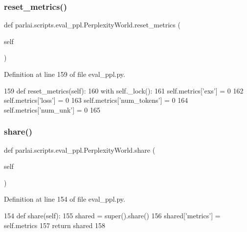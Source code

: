 \subsubsection{\texorpdfstring{reset\+\_\+metrics()}{reset\_metrics()}}
{\footnotesize\ttfamily def parlai.\+scripts.\+eval\+\_\+ppl.\+Perplexity\+World.\+reset\+\_\+metrics (\begin{DoxyParamCaption}\item[{}]{self }\end{DoxyParamCaption})}



Definition at line 159 of file eval\+\_\+ppl.\+py.


\begin{DoxyCode}
159     \textcolor{keyword}{def }reset\_metrics(self):
160         with self.\_lock():
161             self.metrics[\textcolor{stringliteral}{'exs'}] = 0
162             self.metrics[\textcolor{stringliteral}{'loss'}] = 0
163             self.metrics[\textcolor{stringliteral}{'num\_tokens'}] = 0
164             self.metrics[\textcolor{stringliteral}{'num\_unk'}] = 0
165 
\end{DoxyCode}
\mbox{\label{classparlai_1_1scripts_1_1eval__ppl_1_1PerplexityWorld_a2326b854872d6df841070d9d8076a9ff}} 
\subsubsection{\texorpdfstring{share()}{share()}}
{\footnotesize\ttfamily def parlai.\+scripts.\+eval\+\_\+ppl.\+Perplexity\+World.\+share (\begin{DoxyParamCaption}\item[{}]{self }\end{DoxyParamCaption})}



Definition at line 154 of file eval\+\_\+ppl.\+py.


\begin{DoxyCode}
154     \textcolor{keyword}{def }share(self):
155         shared = super().share()
156         shared[\textcolor{stringliteral}{'metrics'}] = self.metrics
157         \textcolor{keywordflow}{return} shared
158 
\end{DoxyCode}


